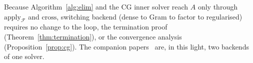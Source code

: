 Because Algorithm~\ref{alg:elim} and the CG inner solver reach $A$ only through
$\mathrm{apply}_{\mathcal{F}}$ and $\mathrm{cross}$, switching backend (dense to Gram to factor
to regularised) requires no change to the loop, the termination proof
(Theorem~\ref{thm:termination}), or the convergence analysis (Proposition~\ref{prop:cg}). The
companion papers~\cite{schmelzer2026matrixfree,schmelzer2026rmt} are, in this light, two
backends of one solver.
